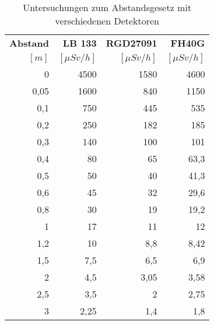 \documentclass{article}
\begin{document}
\begin{table}[h!]
  	\begin{center}
  	
    	\begin{tabular}{r|r|r|r}
      	\textbf{Abstand} & \textbf{LB 133} & \textbf{RGD27091} & \textbf{FH40G} \\
      	$[m]$ & $[\mu Sv/h]$ & $[\mu Sv/h]$ & $[\mu Sv/h]$  \\
      	\hline
      	0    & 4500  & 1580 & 4600 \\
      	0,05 & 1600  & 840  & 1150 \\
      	0,1  & 750   & 445  & 535  \\
      	0,2  & 250   & 182  & 185  \\
      	0,3  & 140   & 100  & 101  \\
      	0,4  & 80    & 65   & 63,3 \\
      	0,5  & 50    & 40   & 41,3 \\
      	0,6  & 45    & 32   & 29,6 \\
      	0,8  & 30    & 19   & 19,2 \\
      	1    & 17    & 11   & 12   \\
      	1,2  & 10    & 8,8  & 8,42 \\
      	1,5  & 7,5   & 6,5  & 6,9  \\
      	2    & 4,5   & 3,05 & 3,58 \\
      	2,5  & 3,5   & 2    & 2,75 \\
      	3    & 2,25  & 1,4  & 1,8  \\
      
    	\end{tabular}
    	\caption{Untersuchungen zum Abstandsgesetz mit verschiedenen Detektoren}
    	\label{tab:table1}
   
  \end{center}
\end{table}
\end{document}
